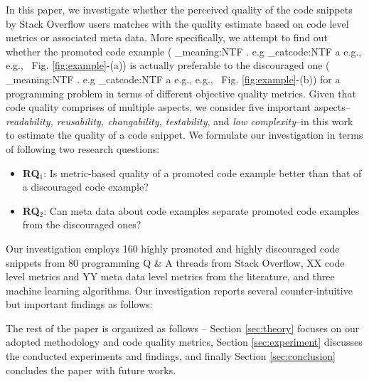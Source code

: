 \documentclass[conference]{IEEEtran}
\makeatletter
\newcommand\latinabbrev[1]{
  \peek_meaning:NTF . {%
    #1\@}%
  { \peek_catcode:NTF a {%
      #1., \@ }%
    {#1., \@}}}
\def\eg{\latinabbrev{e.g}}
\makeatother
\begin{document}
In this paper, we investigate whether the perceived quality of the code snippets by Stack Overflow users matches with the quality estimate based on code level metrics or associated meta data.
More specifically, we attempt to find out whether the promoted code example (\eg\ Fig. \ref{fig:example}-(a)) is actually preferable to the discouraged one (\eg\ Fig. \ref{fig:example}-(b)) for a programming problem in terms of different objective quality metrics. Given that code quality comprises of multiple aspects, we consider five important aspects--\emph{readability, reusability, changability, testability}, and \emph{low complexity}--in this work to estimate the quality of a code snippet. We formulate our investigation in terms of following two research questions:
\begin{itemize}
	\item \textbf{RQ$_1$}: Is metric-based quality of a promoted code example better than that of a discouraged code example?
	\item \textbf{RQ$_2$}: Can meta data about code examples separate promoted code examples from the discouraged ones?
\end{itemize}

Our investigation employs 160 highly promoted and highly discouraged code snippets from 80 programming Q \& A threads from Stack Overflow, XX code level metrics and YY meta data level metrics from the literature, and three machine learning algorithms. Our investigation reports several counter-intuitive but important findings as follows:  


The rest of the paper is organized as follows -- Section \ref{sec:theory}  focuses on our adopted methodology and code quality metrics, Section \ref{sec:experiment} discusses the conducted experiments and findings, and finally Section \ref{sec:conclusion} concludes the paper with future works.
\end{document}
